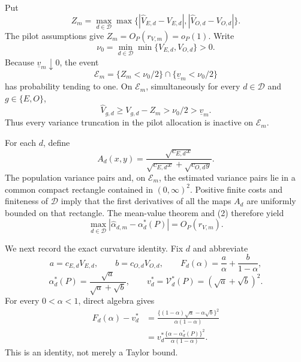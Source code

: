 Put
\[
 Z_m=\max_{d\in\mathcal D}\max\bigl\{
 |\widehat V_{E,d}-V_{E,d}|,
 |\widehat V_{O,d}-V_{O,d}|\bigr\}.
\]
The pilot assumptions give \(Z_m=O_P(r_{V,m})=o_P(1)\).  Write
\[
 \nu_0=\min_{d\in\mathcal D}\min\{V_{E,d},V_{O,d}\}>0.
\]
Because \(\underline v_m\downarrow0\), the event
\[
 \mathcal E_m
 =\{Z_m<\nu_0/2\}\cap\{\underline v_m<\nu_0/2\}             \tag{1}
\]
has probability tending to one.  On \(\mathcal E_m\), simultaneously for every \(d\in\mathcal D\) and \(g\in\{E,O\}\),
\[
 \widehat V_{g,d}\ge V_{g,d}-Z_m>\nu_0/2>\underline v_m.          \tag{2}
\]
Thus every variance truncation in the pilot allocation is inactive on \(\mathcal E_m\).

For each \(d\), define
\[
 A_d(x,y)=
 \frac{\sqrt{c_{E,d}x}}
 {\sqrt{c_{E,d}x}+\sqrt{c_{O,d}y}}.
\]
The population variance pairs and, on \(\mathcal E_m\), the estimated variance pairs lie in a common compact rectangle contained in \((0,\infty)^2\).  Positive finite costs and finiteness of \(\mathcal D\) imply that the first derivatives of all the maps \(A_d\) are uniformly bounded on that rectangle.  The mean-value theorem and (2) therefore yield
\[
 \max_{d\in\mathcal D}
 |\widehat\alpha_{d,m}-\alpha_d^*(P)|
 =O_P(r_{V,m}).                                                     \tag{3}
\]

We next record the exact curvature identity.  Fix \(d\) and abbreviate
\[
 a=c_{E,d}V_{E,d},\qquad b=c_{O,d}V_{O,d},
 \qquad
 F_d(\alpha)=\frac a\alpha+\frac b{1-\alpha},
\]
\[
 \alpha_d^*(P)=\frac{\sqrt a}{\sqrt a+\sqrt b},
 \qquad
 v_d^*=\mathcal V_d^*(P)=(\sqrt a+\sqrt b)^2.
\]
For every \(0<\alpha<1\), direct algebra gives
\[
\begin{aligned}
 F_d(\alpha)-v_d^*
 &=\frac{\{(1-\alpha)\sqrt a-\alpha\sqrt b\}^2}
 {\alpha(1-\alpha)}\\
 &=v_d^*\frac{\{\alpha-\alpha_d^*(P)\}^2}
 {\alpha(1-\alpha)}.                                               \tag{4}
\end{aligned}
\]
This is an identity, not merely a Taylor bound.

